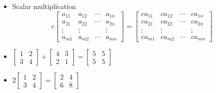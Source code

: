 \documentclass{beamer}
\theoremstyle{definition}
\theoremstyle{remark}
\begin{document}
\begin{frame}[t]
\begin{definition}
\begin{itemize}
\item Scalar multiplication
\[
c\begin{bmatrix}
a_{11}&a_{12}&\cdots&a_{1n}\\
a_{21}&a_{22}&\cdots&a_{2n}\\
\vdots&\vdots&&\vdots\\
a_{m1}&a_{m2}&\cdots&a_{mn}
\end{bmatrix}=\begin{bmatrix}
ca_{11}&ca_{12}&\cdots&ca_{1n}\\
ca_{21}&ca_{22}&\cdots&ca_{2n}\\
\vdots&\vdots&&\vdots\\
ca_{m1}&ca_{m2}&\cdots&ca_{mn}
\end{bmatrix}
\]
\end{itemize}
\end{definition}
\pause
\begin{example}\hfill
\begin{itemize}
\item $\begin{bmatrix}
1&2\\
3&4
\end{bmatrix}+\begin{bmatrix}
4&3\\
2&1
\end{bmatrix}=\begin{bmatrix}
5&5\\
5&5
\end{bmatrix}$\pause
\item $2\begin{bmatrix}
1&2\\
3&4
\end{bmatrix}=\begin{bmatrix}
2&4\\
6&8
\end{bmatrix}$
\end{itemize}
\end{example}
\end{frame}
\end{document}
